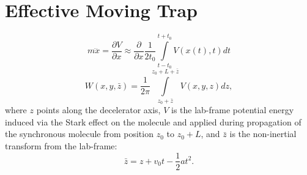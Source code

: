 \documentclass[%
 reprint,
 amsmath,amssymb,
 aps,
pra,
]{revtex4-1}
\begin{document}
%



\appendix

\section{Effective Moving Trap}

\label{app:effpot}
\begin{equation}
m\dddot{x}=\frac{\partial V}{\partial x}\approx \frac{\partial}{\partial x}\frac{1}{2t_0}\int\limits_{t-t_0}^{t+t_0}V(x(t),t)dt
\end{equation}
\begin{equation}
W(x,y,\bar{z}) = \frac{1}{2\pi}\int\limits_{z_0+\bar{z}}^{z_0+L+\bar{z}}V(x,y,z)dz, 
\end{equation}
where $z$ points along the decelerator axis, $V$ is the lab-frame potential energy induced via the Stark effect on the molecule and applied during propagation of the synchronous molecule from position $z_0$ to $z_0+L$, and $\bar{z}$ is the non-inertial transform from the lab-frame: 
\begin{equation}
\bar{z} = z + v_0 t - \frac{1}{2}a t^2.
\end{equation}
\end{document}
